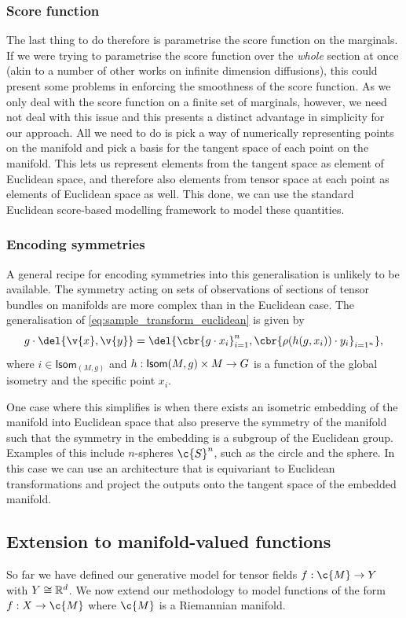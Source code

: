 \subsubsection{Score function}
The last thing to do therefore is parametrise the score function on the marginals.
If we were trying to parametrise the score function over the \textit{whole} section at once (akin to a number of other works on infinite dimension diffusions), this could present some problems in enforcing the smoothness of the score function.
As we only deal with the score function on a finite set of marginals, however, we need not deal with this issue and this presents a distinct advantage in simplicity for our approach.
All we need to do is pick a way of numerically representing points on the manifold and pick a basis for the tangent space of each point on the manifold.
This lets us represent elements from the tangent space as element of Euclidean space, and therefore also elements from tensor space at each point as elements of Euclidean space as well.
This done, we can use the standard Euclidean score-based modelling framework to model these quantities.

\subsubsection{Encoding symmetries}

A general recipe for encoding symmetries into this generalisation is unlikely to be available.
The symmetry acting on sets of observations of sections of tensor bundles on manifolds are more complex than in the Euclidean case.
The generalisation of \cref{eq:sample_transform_euclidean} is given by
\[g \cdot \del{\v{x}, \v{y}} = \del{\cbr{g \cdot x_i}_{i=1}^n, \cbr{\rho(h(g, x_i)) \cdot y_i}_{i=1^n}}\label{eq:sample_transform},\]
where \(i\in\mathsf{Isom}_{(M, g)}\) and \(h: \mathsf{Isom}{(M, g)}\times M \to G\) is a function of the global isometry and the specific point \(x_i\).

One case where this simplifies is when there exists an isometric embedding of the manifold into Euclidean space that also preserve the symmetry of the manifold such that the symmetry in the embedding is a subgroup of the Euclidean group.
Examples of this include \(n\)-spheres \(\c{S}^n\), such as the circle and the sphere.
In this case we can use an architecture that is equivariant to Euclidean transformations and project the outputs onto the tangent space of the embedded manifold.

\subsection{Extension to manifold-valued functions}
\label{sec:manifold_valued_output}
So far we have defined our generative model for tensor fields \(f:\c{M} \to Y\) with \({Y} \cong \mathbb{R}^d\).
We now extend our methodology to model functions of the form \(f: X \to \c{M}\) where \(\c{M}\) is a Riemannian manifold.

